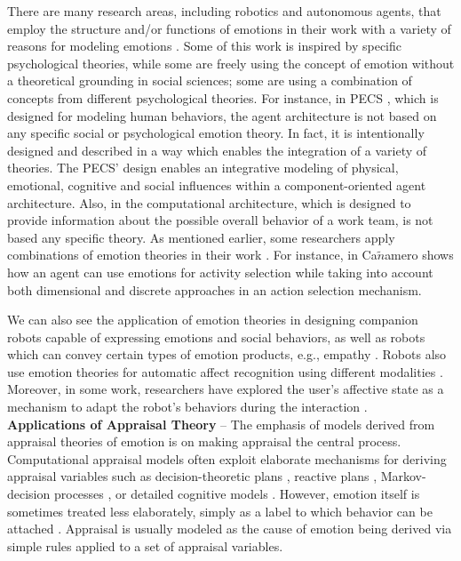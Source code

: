 \documentclass[12pt]{report}
\begin{document}
There are many research areas, including robotics and autonomous agents, that
employ the structure and/or functions of emotions in their work with a variety
of reasons for modeling emotions \cite{wehrle:motivations-modeling-emotion}.
Some of this work is inspired by specific psychological theories, while some are
freely using the concept of emotion without a theoretical grounding in social
sciences; some are using a combination of concepts from different psychological
theories. For instance, in PECS \cite{urban:pecs}, which is designed for
modeling human behaviors, the agent architecture is not based on any specific
social or psychological emotion theory. In fact, it is intentionally designed
and described in a way which enables the integration of a variety of theories.
The PECS' design enables an integrative modeling of physical, emotional,
cognitive and social influences within a component-oriented agent architecture.
Also, in \cite{miranda:teamwork-multiagent-system} the computational
architecture, which is designed to provide information about the possible
overall behavior of a work team, is not based any specific theory. As mentioned
earlier, some researchers apply combinations of emotion theories in their work
\cite{kiryazov:modeling-appraisal-pad}. For instance, in
\cite{canamero:designing-activity-selection} Ca$\tilde{n}$amero shows how an
agent can use emotions for activity selection while taking into account both
dimensional and discrete approaches in an action selection mechanism.

We can also see the application of emotion theories in designing companion
robots capable of expressing emotions and social behaviors, as well as robots
which can convey certain types of emotion products, e.g., empathy
\cite{breazeal:expressive-behavior} \cite{leite:empathy-hri}
\cite{paiva:emotion-modeling} \cite{shayganfar:methodology}. Robots also use
emotion theories for automatic affect recognition using different modalities
\cite{hegel:empathic-robot} \cite{zeng:affect-recognition}. Moreover, in some
work, researchers have explored the user's affective state as a mechanism to
adapt the robot's behaviors during the interaction
\cite{breazeal:sociable-robot} \cite{liu:affect-robot-behavior}.\\

\textbf{Applications of Appraisal Theory} -- The emphasis of models derived from
appraisal theories of emotion is on making appraisal the central process.
Computational appraisal models often exploit elaborate mechanisms for deriving
appraisal variables such as decision-theoretic plans
\cite{gratch:domain-independent} \cite{marsella:ema-process-model}, reactive
plans \cite{rank:appraisal-story-world} \cite{neal:modeling-antecedents}
\cite{staller:emotion-social-norm}, Markov-decision processes
\cite{elnasr:flame} \cite{si:modeling-appraisal-tom-journal}, or detailed
cognitive models \cite{marinier:behavior-emotion}. However, emotion itself is
sometimes treated less elaborately, simply as a label to which behavior can be
attached \cite{elliott:affective-reasoner}. Appraisal is usually modeled as the
cause of emotion being derived via simple rules applied to a set of appraisal
variables.
\end{document}
